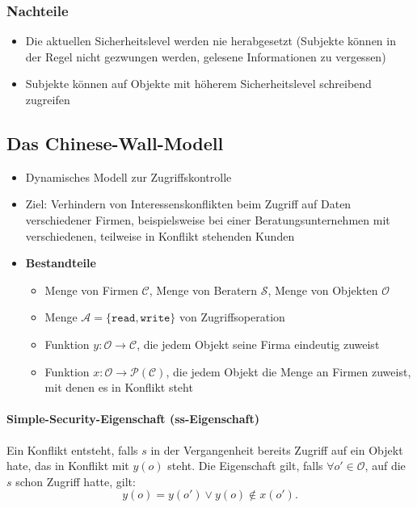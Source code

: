 \subsubsection{Nachteile}
\begin{itemize}
	\item Die aktuellen Sicherheitslevel werden nie herabgesetzt (Subjekte können in der Regel nicht gezwungen werden, gelesene Informationen zu vergessen)
	\item Subjekte können auf Objekte mit höherem Sicherheitslevel schreibend zugreifen
\end{itemize}


\subsection{Das Chinese-Wall-Modell}
\begin{itemize}
	\item Dynamisches Modell zur Zugriffskontrolle
	\item Ziel: Verhindern von Interessenskonflikten beim Zugriff auf Daten verschiedener Firmen, beispielsweise bei einer Beratungsunternehmen mit verschiedenen, teilweise in Konflikt stehenden Kunden
	\item \textbf{Bestandteile}
	\begin{itemize}
		\item Menge von Firmen \(\mathcal{C}\), Menge von Beratern \(\mathcal{S}\), Menge von Objekten \(\mathcal{O}\)
		\item Menge \(\mathcal{A} = \{\texttt{read},\texttt{write}\}\) von Zugriffsoperation
		\item Funktion \(y: \mathcal{O} \rightarrow \mathcal{C}\), die jedem Objekt seine Firma eindeutig zuweist
		\item Funktion \(x: \mathcal{O} \rightarrow \mathcal{P}(\mathcal{C})\), die jedem Objekt die Menge an Firmen zuweist, mit denen es in Konflikt steht
	\end{itemize}
\end{itemize}

\paragraph{Simple-Security-Eigenschaft (ss-Eigenschaft)}
Ein Konflikt entsteht, falls \(s\) in der Vergangenheit bereits Zugriff auf ein Objekt hate, das in Konflikt mit \(y(o)\) steht. Die Eigenschaft gilt, falls \(\forall o' \in \mathcal{O}\), auf die \(s\) schon Zugriff hatte, gilt:
\[y(o) = y(o') \vee y(o) \notin x(o').\]

